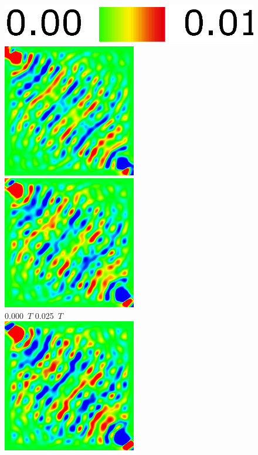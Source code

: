 \documentclass[a4j, twocolumn]{jsarticle}
\begin{document}
\begin{figure}
\centering
\includegraphics[width=0.4\hsize]{./figures/colorbar_001.eps} \\
\includegraphics[width=0.4\hsize]{./figures/capture/sin/sinsqr128_32i_l_dif_5760} \ 
\includegraphics[width=0.4\hsize]{./figures/capture/sin/sinsqr128_32i_l_dif_5761} \\
0.000\ $T$ \hspace*{0.25\hsize} 0.025\ $T$  \vspace{5pt}\\
\includegraphics[width=0.4\hsize]{./figures/capture/sin/sinsqr128_32i_l_dif_5762} \ 

\end{figure}
\end{document}
